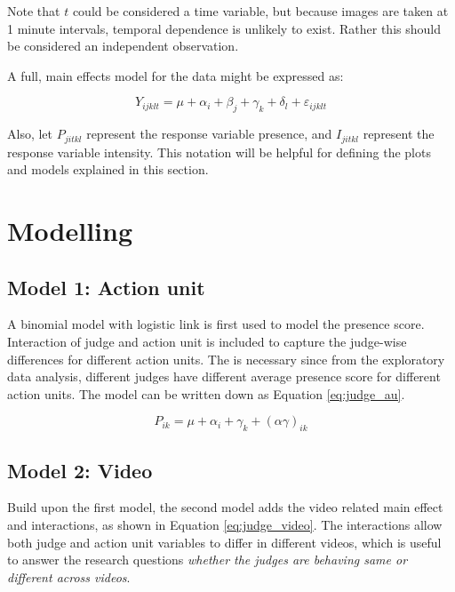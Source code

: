 \documentclass{monashthesis}
\begin{document}
Note that \(t\) could be considered a time variable, but because images are taken at 1 minute intervals, temporal dependence is unlikely to exist. Rather this should be considered an independent observation.

A full, main effects model for the data might be expressed as:

\[Y_{ijklt} = \mu + \alpha_i + \beta_j + \gamma_k + \delta_l + \varepsilon_{ijklt}\]

\noindent Also, let \(P_{jitkl}\) represent the response variable presence, and \(I_{jitkl}\) represent the response variable intensity. This notation will be helpful for defining the plots and models explained in this section.

\hypertarget{modelling}{%
\section{Modelling}\label{modelling}}

\hypertarget{model-1-action-unit}{%
\subsection{Model 1: Action unit}\label{model-1-action-unit}}

A binomial model with logistic link is first used to model the presence score. Interaction of judge and action unit is included to capture the judge-wise differences for different action units. The is necessary since from the exploratory data analysis, different judges have different average presence score for different action units. The model can be written down as Equation \ref{eq:judge_au}.

\begin{equation}\label{eq:judge_au}
P_{ik} = \mu + \alpha_i + \gamma_k + (\alpha\gamma)_{ik}
\end{equation}

\hypertarget{model-2-video}{%
\subsection{Model 2: Video}\label{model-2-video}}

Build upon the first model, the second model adds the video related main effect and interactions, as shown in Equation \ref{eq:judge_video}. The interactions allow both judge and action unit variables to differ in different videos, which is useful to answer the research questions \emph{whether the judges are behaving same or different across videos}.
\end{document}
